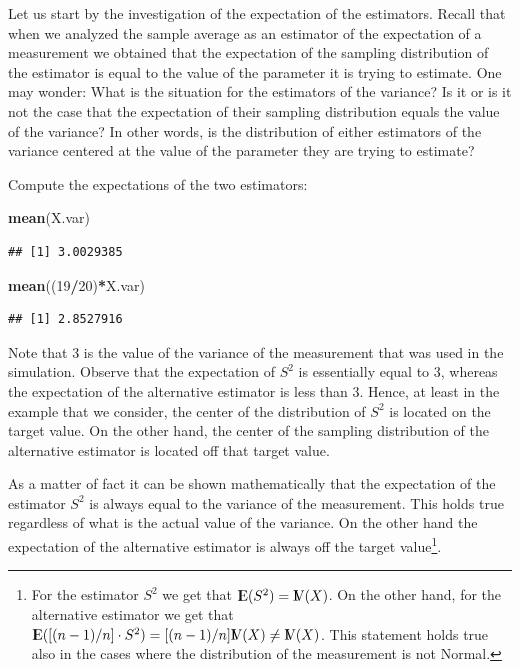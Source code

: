 \documentclass[]{krantz}
\makeatletter
\newenvironment{Shaded}{\begin{snugshade}}{\end{snugshade}}
\newcommand{\DecValTok}[1]{\textcolor[rgb]{0.00,0.00,0.81}{#1}}
\newcommand{\KeywordTok}[1]{\textcolor[rgb]{0.13,0.29,0.53}{\textbf{#1}}}
\newcommand{\NormalTok}[1]{#1}
\newcommand{\OperatorTok}[1]{\textcolor[rgb]{0.81,0.36,0.00}{\textbf{#1}}}
\newcommand{\Expec}{{\rm I\kern-.3em E}}
\newcommand{\Var}{{\rm I\kern-.3em V}}
\newenvironment{kframe}{%
\medskip{}
\setlength{\fboxsep}{.8em}
 \def\at@end@of@kframe{}%
 \ifinner\ifhmode%
  \def\at@end@of@kframe{\end{minipage}}%
  \begin{minipage}{\columnwidth}%
 \fi\fi%
 \def\FrameCommand##1{\hskip\@totalleftmargin \hskip-\fboxsep
 \colorbox{shadecolor}{##1}\hskip-\fboxsep
     \hskip-\linewidth \hskip-\@totalleftmargin \hskip\columnwidth}%
 \MakeFramed {\advance\hsize-\width
   \@totalleftmargin\z@ \linewidth\hsize
   \@setminipage}}%
 {\par\unskip\endMakeFramed%
 \at@end@of@kframe}
\renewenvironment{Shaded}{\begin{kframe}}{\end{kframe}}
\theoremstyle{definition}
\theoremstyle{definition}
\theoremstyle{definition}
\theoremstyle{remark}
\makeatother
\begin{document}
Let us start by the investigation of the expectation of the estimators.
Recall that when we analyzed the sample average as an estimator of the
expectation of a measurement we obtained that the expectation of the
sampling distribution of the estimator is equal to the value of the
parameter it is trying to estimate. One may wonder: What is the
situation for the estimators of the variance? Is it or is it not the
case that the expectation of their sampling distribution equals the
value of the variance? In other words, is the distribution of either
estimators of the variance centered at the value of the parameter they
are trying to estimate?

Compute the expectations of the two estimators:

\begin{Shaded}
\begin{Highlighting}[]
\KeywordTok{mean}\NormalTok{(X.var)}
\end{Highlighting}
\end{Shaded}

\begin{verbatim}
## [1] 3.0029385
\end{verbatim}

\begin{Shaded}
\begin{Highlighting}[]
\KeywordTok{mean}\NormalTok{((}\DecValTok{19}\OperatorTok{/}\DecValTok{20}\NormalTok{)}\OperatorTok{*}\NormalTok{X.var)}
\end{Highlighting}
\end{Shaded}

\begin{verbatim}
## [1] 2.8527916
\end{verbatim}

Note that 3 is the value of the variance of the measurement that was
used in the simulation. Observe that the expectation of \(S^2\) is
essentially equal to 3, whereas the expectation of the alternative
estimator is less than 3. Hence, at least in the example that we
consider, the center of the distribution of \(S^2\) is located on the
target value. On the other hand, the center of the sampling distribution
of the alternative estimator is located off that target value.

As a matter of fact it can be shown mathematically that the expectation
of the estimator \(S^2\) is always equal to the variance of the
measurement. This holds true regardless of what is the actual value of
the variance. On the other hand the expectation of the alternative
estimator is always off the target value\footnote{For the estimator \(S^2\) we get that \(\Expec(S^2) = \Var(X)\). On
  the other hand, for the alternative estimator we get that
  \(\Expec([(n-1)/n]\cdot S^2) = [(n-1)/n]\Var(X) \not = \Var(X)\). This
  statement holds true also in the cases where the distribution of the
  measurement is not Normal.}.
\end{document}
